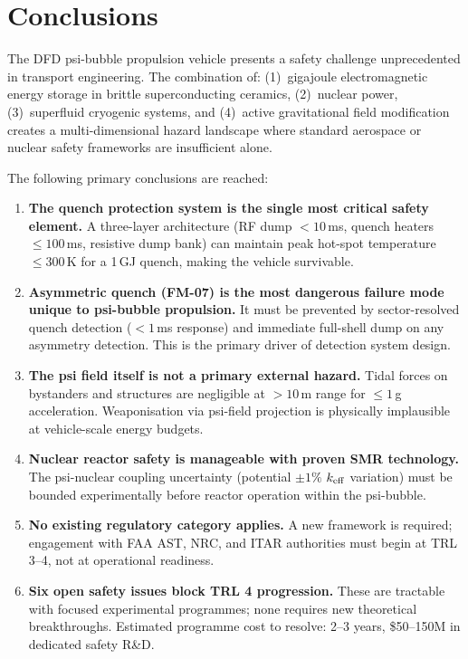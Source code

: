 \documentclass[11pt,a4paper]{article}
\begin{document}
\section{Conclusions}

The DFD psi-bubble propulsion vehicle presents a safety challenge
unprecedented in transport engineering. The combination of:
(1)~gigajoule electromagnetic energy storage in brittle superconducting
ceramics, (2)~nuclear power, (3)~superfluid cryogenic systems, and
(4)~active gravitational field modification creates a multi-dimensional
hazard landscape where standard aerospace or nuclear safety frameworks
are insufficient alone.

The following primary conclusions are reached:

\begin{enumerate}
  \item \textbf{The quench protection system is the single most critical
    safety element.} A three-layer architecture (RF dump $<10$\,ms,
    quench heaters $\leq 100$\,ms, resistive dump bank) can maintain
    peak hot-spot temperature $\leq 300$\,K for a 1\,GJ quench, making
    the vehicle survivable.

  \item \textbf{Asymmetric quench (FM-07) is the most dangerous failure
    mode unique to psi-bubble propulsion.} It must be prevented by
    sector-resolved quench detection ($< 1$\,ms response) and immediate
    full-shell dump on any asymmetry detection. This is the primary
    driver of detection system design.

  \item \textbf{The psi field itself is not a primary external hazard.}
    Tidal forces on bystanders and structures are negligible at $> 10$\,m
    range for $\leq 1$\,g acceleration. Weaponisation via psi-field
    projection is physically implausible at vehicle-scale energy budgets.

  \item \textbf{Nuclear reactor safety is manageable with proven SMR
    technology.} The psi-nuclear coupling uncertainty (potential
    $\pm 1\%$ $k_{\rm eff}$ variation) must be bounded experimentally
    before reactor operation within the psi-bubble.

  \item \textbf{No existing regulatory category applies.} A new
    framework is required; engagement with FAA AST, NRC, and ITAR
    authorities must begin at TRL 3--4, not at operational readiness.

  \item \textbf{Six open safety issues block TRL 4 progression.}
    These are tractable with focused experimental programmes; none
    requires new theoretical breakthroughs. Estimated programme
    cost to resolve: 2--3 years, \$50--150M in dedicated safety R\&D.
\end{enumerate}
\end{document}
